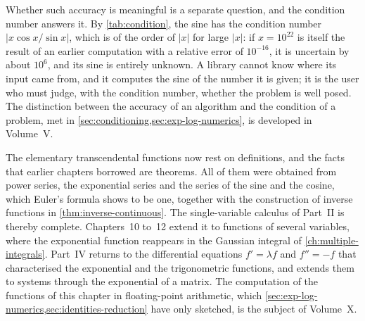 Whether such accuracy is meaningful is a separate question, and the condition number answers it. By \cref{tab:condition}, the sine has the condition number $|x\cos x/\sin x|$, which is of the order of $|x|$ for large $|x|$: if $x=10^{22}$ is itself the result of an earlier computation with a relative error of $10^{-16}$, it is uncertain by about $10^6$, and its sine is entirely unknown. A library cannot know where its input came from, and it computes the sine of the number it is given; it is the user who must judge, with the condition number, whether the problem is well posed. The distinction between the accuracy of an algorithm and the condition of a problem, met in \cref{sec:conditioning,sec:exp-log-numerics}, is developed in Volume~V.

\bigskip
The elementary transcendental functions now rest on definitions, and the facts that earlier chapters borrowed are theorems. All of them were obtained from power series, the exponential series and the series of the sine and the cosine, which Euler's formula shows to be one, together with the construction of inverse functions in \cref{thm:inverse-continuous}. The single-variable calculus of Part~II is thereby complete. Chapters~10 to~12 extend it to functions of several variables, where the exponential function reappears in the Gaussian integral of \cref{ch:multiple-integrals}. Part~IV returns to the differential equations $f'=\lambda f$ and $f''=-f$ that characterised the exponential and the trigonometric functions, and extends them to systems through the exponential of a matrix. The computation of the functions of this chapter in floating-point arithmetic, which \cref{sec:exp-log-numerics,sec:identities-reduction} have only sketched, is the subject of Volume~X.

\chapternotes

